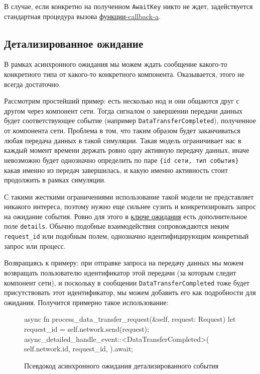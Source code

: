 В случае, если конкретно на полученном \texttt{AwaitKey} никто не ждет, задействуется стандартная процедура вызова \hyperref[fnon]{функции-callback-a}.

\subsection{Детализированное ожидание} \label{detailed-await}

В рамках асинхронного ожидания мы можем ждать сообщение какого-то конкретного типа от какого-то конкретного компонента. Оказывается, этого не всегда достаточно. 

Рассмотрим простейший пример: есть несколько нод и они общаются друг с другом через компонент сети. Тогда сигналом о завершении передачи данных будет соответствующее событие (например \texttt{DataTransferCompleted}), полученное от компонента сети. Проблема в том, что таким образом будет заканчиваться любая передача данных в такой симуляции. Такая модель ограничивает нас в каждый момент времени держать ровно одну активную передачу данных, иначе невозможно будет однозначно определить по паре \texttt{\{id сети, тип события\}} какая именно из передач завершилась, и какую именно активность стоит продолжить в рамках симуляции. 

С такими жесткими ограничениями использование такой модели не представляет никакого интереса, поэтому нужно еще сильнее сузить и конкретизировать запрос на ожидание события. Ровно для этого в \hyperref[awaitkey]{ключе ожидания} есть дополнительное поле \texttt{details}. Обычно подобные взаимодействия сопровождаются неким \texttt{request\_id} или подобным полем, однозначно идентифицирующим конкретный запрос или процесс. 

Возвращаясь к примеру: при отправке запроса на передачу данных мы можем возвращать пользователю идентификатор этой передачи (за которым следит компонент сети), и поскольку в сообщении \texttt{DataTransferCompleted} тоже будет присутствовать этот идентификатор, мы можем добавить его как подробности для ожидания. Получится примерно такое использование: 
\begin{figure}[H]
    \small
\begin{rustcode}
async fn process_data_transfer_request(&self, request: Request) {
    let request_id = self.network.send(request);
    async_detailed_handle_event::<DataTransferCompleted>(
        self.network.id, 
        request_id,
    ).await;
}
\end{rustcode}
\caption{Псевдокод асинхронного ожидания детализированного события}
\label{async-detailed-pseudocode}
\end{figure}

